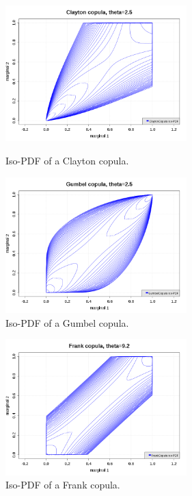 \begin{figure}[H]
  \begin{minipage}{10cm}
    \begin{center}
      \includegraphics[width=7cm]{ClaytonCopula.png}
      \caption{Iso-PDF of a Clayton copula.}
      \label{ClaytonCopulaIsoPDF}
    \end{center}
  \end{minipage}
  \hfill
  \begin{minipage}{10cm}
    \begin{center}
      \includegraphics[width=7cm]{GumbelCopula.png}
      \caption{Iso-PDF of a Gumbel copula.}
      \label{GumbelCopulaIsoPDF}
    \end{center}
  \end{minipage}
\end{figure}


\begin{figure}[H]
  \begin{center}
    \includegraphics[width=7cm]{FrankCopula.png}
  \end{center}
  \caption{Iso-PDF of a Frank copula.}
  \label{FrankCopulaIsoPDF}
\end{figure}


